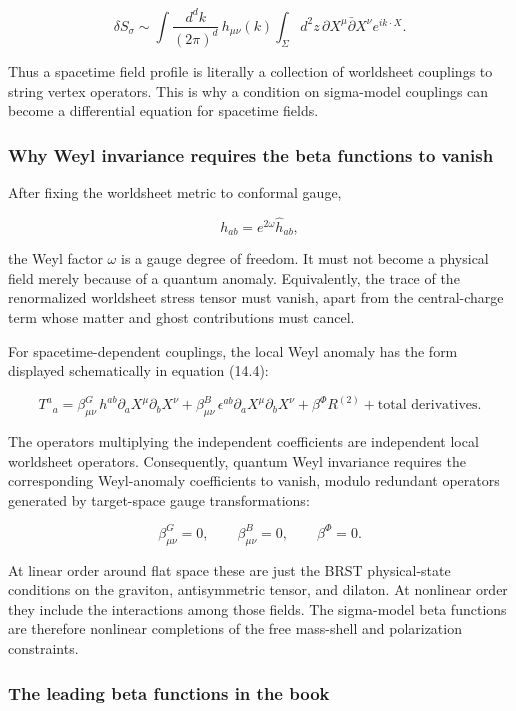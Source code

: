 \documentclass[
  10pt,
  a4paper,
  openany]{book}
\begin{document}
\[
\delta S_\sigma
\sim
\int\frac{d^dk}{(2\pi)^d}\,
h_{\mu\nu}(k)
\int_\Sigma d^2z\,
\partial X^\mu\bar\partial X^\nu e^{ik\cdot X}.
\]

Thus a spacetime field profile is literally a collection of worldsheet
couplings to string vertex operators. This is why a condition on
sigma-model couplings can become a differential equation for spacetime
fields.

\subsubsection{Why Weyl invariance requires the beta functions to
vanish}\label{why-weyl-invariance-requires-the-beta-functions-to-vanish}

After fixing the worldsheet metric to conformal gauge,

\[
h_{ab}=e^{2\omega}\hat h_{ab},
\]

the Weyl factor \(\omega\) is a gauge degree of freedom. It must not
become a physical field merely because of a quantum anomaly.
Equivalently, the trace of the renormalized worldsheet stress tensor
must vanish, apart from the central-charge term whose matter and ghost
contributions must cancel.

For spacetime-dependent couplings, the local Weyl anomaly has the form
displayed schematically in equation (14.4):

\[
T^a{}_a
=
\beta^G_{\mu\nu}\,
h^{ab}\partial_aX^\mu\partial_bX^\nu
+\beta^B_{\mu\nu}\,
\epsilon^{ab}\partial_aX^\mu\partial_bX^\nu
+\beta^\Phi R^{(2)}
+\text{total derivatives}.
\]

The operators multiplying the independent coefficients are independent
local worldsheet operators. Consequently, quantum Weyl invariance
requires the corresponding Weyl-anomaly coefficients to vanish, modulo
redundant operators generated by target-space gauge transformations:

\[
\beta^G_{\mu\nu}=0,
\qquad
\beta^B_{\mu\nu}=0,
\qquad
\beta^\Phi=0.
\]

At linear order around flat space these are just the BRST physical-state
conditions on the graviton, antisymmetric tensor, and dilaton. At
nonlinear order they include the interactions among those fields. The
sigma-model beta functions are therefore nonlinear completions of the
free mass-shell and polarization constraints.

\subsubsection{The leading beta functions in the
book}\label{the-leading-beta-functions-in-the-book}
\end{document}
